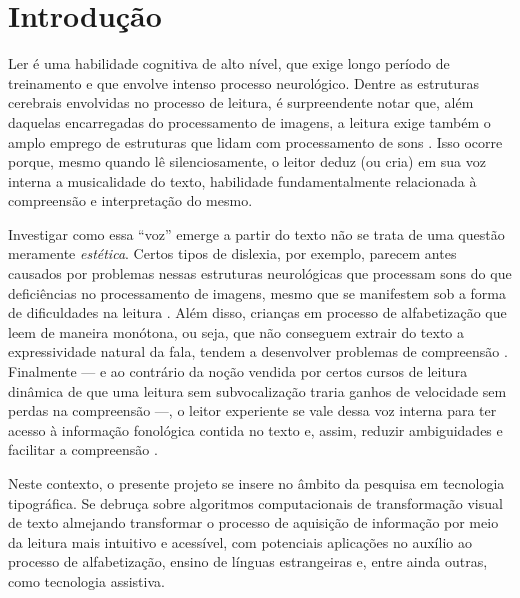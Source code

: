 \documentclass[a4paper,11pt,titlepage,singlespacing]{article}
\begin{document}
\thispagestyle{empty}
\newpage
{}


\renewcommand{\contentsname}{Sumário}
\tableofcontents

\newpage

\section{Introdução}

\noindent Ler é uma habilidade cognitiva de alto nível, que exige longo período de treinamento e que envolve intenso processo neurológico. Dentre as estruturas cerebrais envolvidas no processo de leitura, é surpreendente notar que, além daquelas encarregadas do processamento de imagens, a leitura exige também o amplo emprego de estruturas que lidam com processamento de sons \cite[cap.7]{seidenberg2017}. Isso ocorre porque, mesmo quando lê silenciosamente, o leitor deduz (ou cria) em sua voz interna a musicalidade do texto, habilidade fundamentalmente relacionada à compreensão e interpretação do mesmo.

Investigar como essa ``voz'' emerge a partir do texto não se trata de uma questão meramente \textit{estética}. Certos tipos de dislexia, por exemplo, parecem antes causados por problemas nessas estruturas neurológicas que processam sons do que deficiências no processamento de imagens, mesmo que se manifestem sob a forma de dificuldades na  leitura \cite[cap.8]{seidenberg2017}. Além disso, crianças em processo de alfabetização que leem de maneira monótona, ou seja, que não conseguem extrair do texto a expressividade natural da fala, tendem a desenvolver problemas de compreensão \cite{bessemans2017}. Finalmente — e ao contrário da noção vendida por certos cursos de leitura dinâmica de que uma leitura sem subvocalização traria ganhos de velocidade sem perdas na compreensão —, o leitor experiente se vale dessa voz interna para ter acesso à informação fonológica contida no texto e, assim, reduzir ambiguidades e facilitar a compreensão \cite[cap.4]{seidenberg2017}.

Neste contexto, o presente projeto se insere no âmbito da pesquisa em tecnologia tipográfica. Se debruça sobre algoritmos computacionais de transformação visual de texto almejando transformar o processo de aquisição de informação por meio da leitura mais intuitivo e acessível, com potenciais aplicações no auxílio ao processo de alfabetização, ensino de línguas estrangeiras e, entre ainda outras, como tecnologia assistiva.
\end{document}
